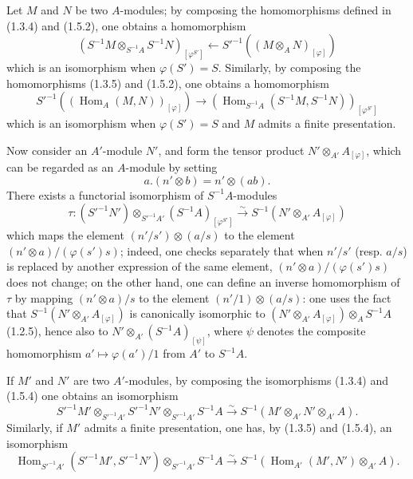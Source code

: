 \begin{env}[1.5.3]
\label{0.1.5.3}
Let $M$ and $N$ be two $A$-modules; by composing the homomorphisms defined in (1.3.4) and (1.5.2), one obtains a homomorphism
\[
  (S^{-1}M\otimes_{S^{-1}A}S^{-1}N)_{[\varphi^{S'}]}
  \longleftarrow
  S'^{-1}((M\otimes_A N)_{[\varphi]})
\]
which is an isomorphism when $\varphi(S')=S$.
Similarly, by composing the homomorphisms (1.3.5) and (1.5.2), one obtains a homomorphism
\[
  S'^{-1}((\operatorname{Hom}_A(M,N))_{[\varphi]})
  \longrightarrow
  (\operatorname{Hom}_{S^{-1}A}(S^{-1}M,S^{-1}N))_{[\varphi^{S'}]}
\]
which is an isomorphism when $\varphi(S')=S$ and $M$ admits a finite presentation.
\end{env}

\begin{env}[1.5.4]
\label{0.1.5.4}
Now consider an $A'$-module $N'$, and form the tensor product $N'\otimes_{A'}A_{[\varphi]}$, which can be regarded as an $A$-module by setting
\[
  a.(n'\otimes b)=n'\otimes(ab).
\]
There exists a functorial isomorphism of $S^{-1}A$-modules
\[
  \tau:(S'^{-1}N')\otimes_{S'^{-1}A'}(S^{-1}A)_{[\varphi^{S'}]}
  \xrightarrow{\sim}
  S^{-1}(N'\otimes_{A'}A_{[\varphi]})
\]
which maps the element $(n'/s')\otimes(a/s)$ to the element
$(n'\otimes a)/(\varphi(s')s)$; indeed, one checks separately that when
$n'/s'$ (resp. $a/s$) is replaced by another expression of the same element,
$(n'\otimes a)/(\varphi(s')s)$ does not change; on the other hand, one can define an
inverse homomorphism of $\tau$ by mapping $(n'\otimes a)/s$ to the element
$(n'/1)\otimes(a/s)$: one uses the fact that
$S^{-1}(N'\otimes_{A'}A_{[\varphi]})$ is canonically isomorphic to
$(N'\otimes_{A'}A_{[\varphi]})\otimes_A S^{-1}A$ (1.2.5), hence also to
$N'\otimes_{A'}(S^{-1}A)_{[\psi]}$, where $\psi$ denotes the composite
homomorphism $a'\mapsto\varphi(a')/1$ from $A'$ to $S^{-1}A$.
\end{env}

\begin{env}[1.5.5]
\label{0.1.5.5}
If $M'$ and $N'$ are two $A'$-modules, by composing the isomorphisms (1.3.4)
and (1.5.4) one obtains an isomorphism
\[
  S'^{-1}M'\otimes_{S'^{-1}A'}S'^{-1}N'
  \otimes_{S'^{-1}A'}S^{-1}A
  \xrightarrow{\sim}
  S^{-1}(M'\otimes_{A'}N'\otimes_{A'}A).
\]
Similarly, if $M'$ admits a finite presentation, one has, by (1.3.5) and
(1.5.4), an isomorphism
\[
  \operatorname{Hom}_{S'^{-1}A'}(S'^{-1}M',S'^{-1}N')
  \otimes_{S'^{-1}A'}S^{-1}A
  \xrightarrow{\sim}
  S^{-1}(\operatorname{Hom}_{A'}(M',N')\otimes_{A'}A).
\]
\end{env}

